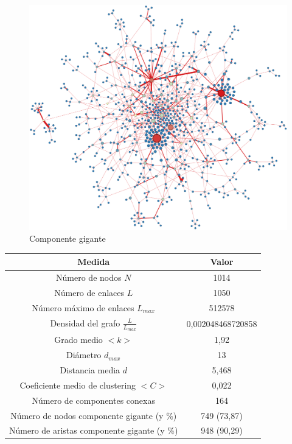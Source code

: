 \documentclass[paper=a4, fontsize=11pt]{article} %
\numberwithin{equation}{section} %
\numberwithin{figure}{section} %
\numberwithin{table}{section} %
\begin{document}
\begin{figure}[H]
  \centering
  \includegraphics[scale=0.225]{componente_gigante}
  \caption{Componente gigante}
  \label{giant}
\end{figure}

\begin{center}  
\begin{tabular}{|c|c|}
\hline
\textbf{Medida} & Valor \\
\hline
Número de nodos $N$ & 1014 \\
\hline
Número de enlaces $L$ & 1050 \\
\hline
Número máximo de enlaces $L_{max}$ & 512578 \\
\hline
Densidad del grafo $\frac{L}{L_{max}}$ & 0,002048468720858 \\
\hline
Grado medio $<k>$ & 1,92 \\
\hline
Diámetro $d_{max}$ & 13 \\
\hline
Distancia media $d$ & 5,468 \\
\hline
Coeficiente medio de clustering $<C>$ & 0,022 \\
\hline
Número de componentes conexas & 164\\
\hline
Número de nodos componente gigante (y \%) & 749 (73,87) \\
\hline
Número de aristas componente gigante (y \%) & 948 (90,29) \\
\hline  
\end{tabular}
\end{center}
\end{document}
